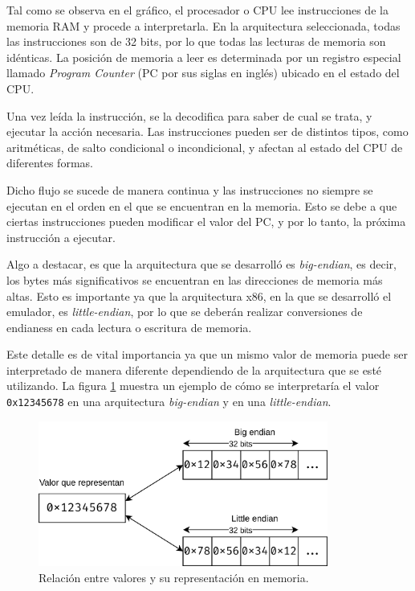 Tal como se observa en el gráfico, el procesador o CPU lee instrucciones de la memoria RAM y procede a interpretarla. En la arquitectura seleccionada, todas las instrucciones son de 32 bits, por lo que todas las lecturas de memoria son idénticas. La posición de memoria a leer es determinada por un registro especial llamado \textit{Program Counter} (PC por sus siglas en inglés) ubicado en el estado del CPU.

Una vez leída la instrucción, se la decodifica para saber de cual se trata, y ejecutar la acción necesaria. Las instrucciones pueden ser de distintos tipos, como aritméticas, de salto condicional o incondicional, y afectan al estado del CPU de diferentes formas.

Dicho flujo se sucede de manera continua y las instrucciones no siempre se ejecutan en el orden en el que se encuentran en la memoria. Esto se debe a que ciertas instrucciones pueden modificar el valor del PC, y por lo tanto, la próxima instrucción a ejecutar.

Algo a destacar, es que la arquitectura que se desarrolló es \textit{big-endian}, es decir, los bytes más significativos se encuentran en las direcciones de memoria más altas. Esto es importante ya que la arquitectura x86, en la que se desarrolló el emulador, es \textit{little-endian}, por lo que se deberán realizar conversiones de endianess en cada lectura o escritura de memoria.

Este detalle es de vital importancia ya que un mismo valor de memoria puede ser interpretado de manera diferente dependiendo de la arquitectura que se esté utilizando. La figura \ref{fig:endianess} muestra un ejemplo de cómo se interpretaría el valor \texttt{0x12345678} en una arquitectura \textit{big-endian} y en una \textit{little-endian}.

\begin{figure}[htbp]
	\centering
	\includegraphics[width=0.85\textwidth]{./Figures/endianess}
	\caption{Relación entre valores y su representación en memoria.}
	\label{fig:endianess}
\end{figure}

